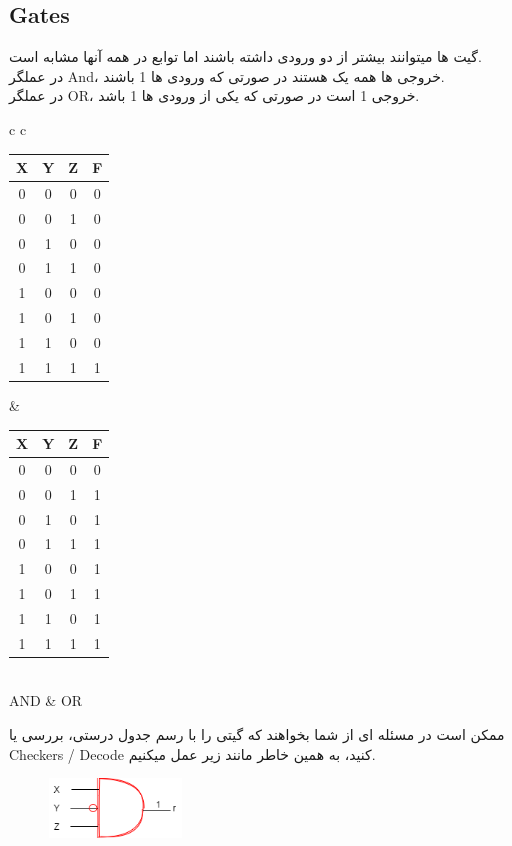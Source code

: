 \documentclass[pt, a5paper]{article}
\begin{document}
\subsection{Gates}
گیت ها میتوانند بیشتر از دو ورودی داشته باشند اما توابع در همه آنها مشابه است.\\
در عملگر And، خروجی ها همه یک هستند در صورتی که ورودی ها 1 باشند.\\
 در عملگر OR، خروجی 1 است در صورتی که یکی از ورودی ها 1 باشد.\\


\center 
\begin{LTR}
	\begin{tabular}{ c c }
			\begin{tabular}{ c c c | c }
		X & Y & Z & F \\
		\hline
		0 & 0 & 0 &  0\\ 				
		0 & 0 & 1 &  0\\
		0 & 1 & 0 &  0\\
		0 & 1 & 1 &  0\\
		1 & 0 & 0 &  0\\
		1 & 0 & 1 &  0\\
		1 & 1 & 0 &  0\\
		1 & 1 & 1 &  1\\	
	\end{tabular}
	
	&
		\begin{tabular}{ c c c | c }
		X & Y & Z & F \\
		\hline
		0 & 0 & 0 &  0\\ 				
		0 & 0 & 1 &  1\\
		0 & 1 & 0 &  1\\
		0 & 1 & 1 &  1\\
		1 & 0 & 0 &  1\\
		1 & 0 & 1 &  1\\
		1 & 1 & 0 &  1\\
		1 & 1 & 1 &  1\\	
	\end{tabular}\\
	\hline
	AND & OR
	\end{tabular}
\end{LTR}
\hfill \break

\raggedleft
\justifying
ممکن است در مسئله ای از شما بخواهند که گیتی را با رسم جدول درستی، بررسی یا Checkers / Decode کنید، به همین خاطر مانند زیر عمل میکنیم.\\

\begin{figure}[htbp]
	\centerline{\includegraphics[width=100pt]{img/andGate.png}}
\end{figure}
\end{document}
